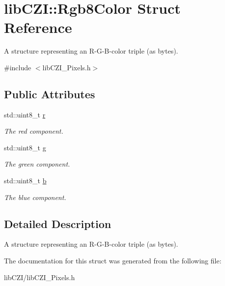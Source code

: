 \hypertarget{structlib_c_z_i_1_1_rgb8_color}{}\section{lib\+C\+ZI\+:\+:Rgb8\+Color Struct Reference}
\label{structlib_c_z_i_1_1_rgb8_color}


A structure representing an R-\/\+G-\/\+B-\/color triple (as bytes).  




{\ttfamily \#include $<$lib\+C\+Z\+I\+\_\+\+Pixels.\+h$>$}

\subsection*{Public Attributes}
\begin{DoxyCompactItemize}
\item 
\mbox{\label{structlib_c_z_i_1_1_rgb8_color_acdf7d80ba3adccfc7866b4c0f182248c}} 
std\+::uint8\+\_\+t \hyperlink{structlib_c_z_i_1_1_rgb8_color_acdf7d80ba3adccfc7866b4c0f182248c}{r}
\begin{DoxyCompactList}\small\item\em The red component. \end{DoxyCompactList}\item 
\mbox{\label{structlib_c_z_i_1_1_rgb8_color_ac65ccfe0906c981fffe91d03aeb1c5e6}} 
std\+::uint8\+\_\+t \hyperlink{structlib_c_z_i_1_1_rgb8_color_ac65ccfe0906c981fffe91d03aeb1c5e6}{g}
\begin{DoxyCompactList}\small\item\em The green component. \end{DoxyCompactList}\item 
\mbox{\label{structlib_c_z_i_1_1_rgb8_color_a6d3a9bfebe412e8febb32e8ea313ee40}} 
std\+::uint8\+\_\+t \hyperlink{structlib_c_z_i_1_1_rgb8_color_a6d3a9bfebe412e8febb32e8ea313ee40}{b}
\begin{DoxyCompactList}\small\item\em The blue component. \end{DoxyCompactList}\end{DoxyCompactItemize}


\subsection{Detailed Description}
A structure representing an R-\/\+G-\/\+B-\/color triple (as bytes). 

The documentation for this struct was generated from the following file\+:\begin{DoxyCompactItemize}
\item 
lib\+C\+Z\+I/lib\+C\+Z\+I\+\_\+\+Pixels.\+h\end{DoxyCompactItemize}

